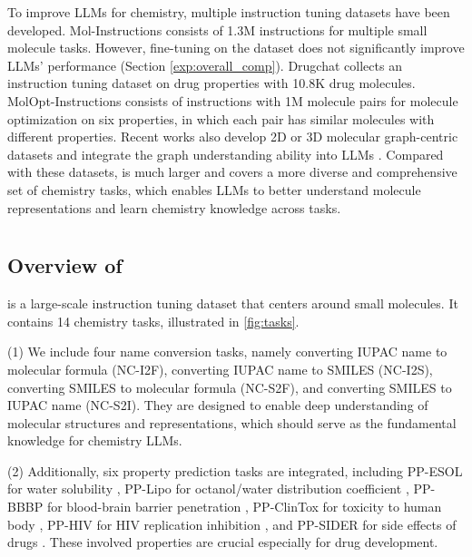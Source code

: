 To improve LLMs for chemistry, multiple instruction tuning datasets have been developed. %
Mol-Instructions \cite{fang2023mol} consists of 1.3M instructions for multiple small molecule tasks.
{However, fine-tuning on the dataset does not significantly improve LLMs' performance (Section \ref{exp:overall_comp}).}
Drugchat \cite{Liang2023a} collects an instruction tuning dataset on drug properties with 10.8K drug molecules.
MolOpt-Instructions \cite{ye2023drugassist} consists of instructions with 1M molecule pairs for molecule optimization on six properties, in which each pair has similar molecules with different properties. 
Recent works also develop 2D or 3D molecular graph-centric datasets and integrate the graph understanding ability into LLMs \cite{liu-etal-2023-molca, cao2023instructmol, li2024towards}.
Compared with these datasets, %
\datasetname is {much larger}
and covers {a} more diverse and comprehensive {set of} chemistry tasks, which enables LLMs to better understand molecule representations and learn chemistry knowledge across tasks.

\section{\datasetname}

\subsection{Overview of \datasetname}
\label{subsec:dataset_overview}

\datasetname is a large-scale instruction tuning dataset that centers around small molecules. It contains 14 chemistry tasks, illustrated in \cref{fig:tasks}.

(1) We include four {name conversion} tasks, namely converting {IUPAC name} to molecular {formula} (NC-I2F), converting {IUPAC name} to {SMILES} (NC-I2S), converting {SMILES} to molecular formula (NC-S2F), and converting {SMILES} to {IUPAC name} (NC-S2I). They are designed to enable deep understanding of molecular structures and representations, which should serve as the fundamental knowledge for chemistry LLMs.

(2) Additionally, six {property prediction} tasks \citep{wu2018moleculenet} are integrated, including PP-ESOL for water solubility \citep{Mobley2014}, PP-Lipo for octanol/water distribution coefficient \citep{Poole2003}, PP-BBBP for blood-brain barrier penetration \citep{martins2012}, PP-ClinTox for toxicity to human body \citep{Gayvert2016}, PP-HIV for HIV replication inhibition \citep{HIV}, and PP-SIDER for side effects of drugs \citep{Kuhn2015}. These involved properties are crucial especially for drug development.

